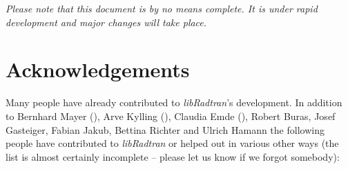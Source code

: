 {\sl Please note that this document is by no means complete. It is
under rapid development and major changes will take place.} 


\section*{Acknowledgements}

Many people have already contributed to {\sl libRadtran}'s
development. In addition to Bernhard Mayer (), Arve Kylling (), Claudia Emde
(), Robert Buras, Josef Gasteiger,
Fabian Jakub, Bettina Richter
and Ulrich Hamann the following people have
contributed to {\sl libRadtran} or helped out in various other ways
(the list is almost certainly incomplete -- please let us know if we
forgot somebody):


